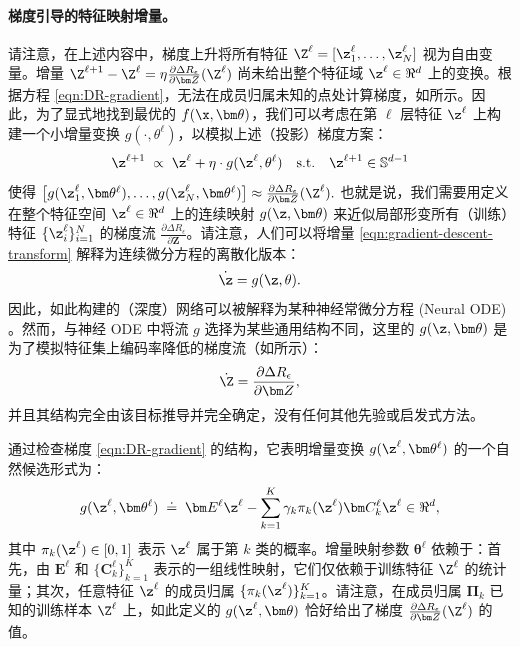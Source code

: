 \documentclass[../../book-main_zh.tex]{subfiles}
\begin{document}
\paragraph{梯度引导的特征映射增量。} 请注意，在上述内容中，梯度上升将所有特征 $\Z^{\ell} =
[\z^{\ell}_{1}, \dots, \z^{\ell}_{N}]$ 视为自由变量。增量 $\Z^{\ell+1} - \Z^{\ell} = \eta \frac{\partial \Delta
R_{\epsilon}}{\partial \bm Z}(\Z^\ell)$ 尚未给出整个特征域 $\z^\ell \in \Re^d$ 上的变换。根据方程 \eqref{eqn:DR-gradient}，无法在成员归属未知的点处计算梯度，如所示。因此，为了显式地找到最优的 $f(\x,\bm  \theta)$，我们可以考虑在第 $\ell$ 层特征 $\z^\ell$ 上构建一个小增量变换 $g(\cdot, \theta^{\ell})$，以模拟上述（投影）梯度方案：
\begin{equation}
    \z^{\ell + 1}   \; \propto \; \z^{\ell} + \eta\cdot  g(\z^{\ell},
    \theta^{\ell}) \quad \text{s.t.} \quad \z^{\ell +1}
    \in \mathbb{S}^{d-1}
    \label{eqn:gradient-descent-transform}
\end{equation}
使得 $\big[g(\z_1^{\ell}, \bm \theta^{\ell}), \ldots,
g(\z_N^{\ell}, \bm \theta^{\ell}) \big] \approx \frac{\partial \Delta
R_{\epsilon}}{\partial \bm Z}(\Z^\ell).$ 也就是说，我们需要用定义在整个特征空间 $\z^\ell \in \Re^d$ 上的连续映射 $g(\z,\bm
\theta)$ 来近似局部形变所有（训练）特征 $\{\z_i^\ell\}_{i=1}^N$ 的梯度流 $\frac{\partial \Delta
R_{\epsilon}}{\partial \bm Z}$。请注意，人们可以将增量 \eqref{eqn:gradient-descent-transform} 解释为连续微分方程的离散化版本：
\begin{equation}
    \dot{\z} = g(\z, \theta).
\end{equation}
因此，如此构建的（深度）网络可以被解释为某种神经常微分方程 (Neural ODE) \cite{chen2018neural}。然而，与神经 ODE 中将流 $g$ 选择为某些通用结构不同，这里的 $g(\z, \bm\theta)$ 是为了模拟特征集上编码率降低的梯度流（如所示）：
\begin{equation*}
    \dot{\Z} = \frac{\partial \Delta R_{\epsilon}}{\partial \bm Z},
\end{equation*}
并且其结构完全由该目标推导并完全确定，没有任何其他先验或启发式方法。

通过检查梯度 \eqref{eqn:DR-gradient} 的结构，它表明增量变换 $g(\z^\ell, \bm \theta^\ell)$ 的一个自然候选形式为：
\begin{equation}
    g(\z^\ell, \bm \theta^\ell) \; \doteq \; \bm E^\ell \z^\ell -
    \sum_{k=1}^K \gamma_{k} \pi_k(\z^\ell)\bm C_{k}^{\ell}  \z^{\ell}
    \in \Re^d,
    \label{eqn:DR-gradient-transform}
\end{equation}
其中 $\pi_k(\z^\ell) \in [0,1]$ 表示 $\z^{\ell}$ 属于第 $k$ 类的概率。增量映射参数 $\bm \theta^\ell$ 依赖于：首先，由 $\bm E^{\ell}$ 和 $\{ \bm C^{\ell}_{k}\}_{k=1}^{K}$ 表示的一组线性映射，它们仅依赖于训练特征 $\Z^\ell$ 的统计量；其次，任意特征 $\z^\ell$ 的成员归属 $\{ \pi_k(\z^\ell)\}_{k=1}^K$。请注意，在成员归属 $\bm \Pi_k$ 已知的训练样本 $\Z^\ell$ 上，如此定义的 $g(\z^\ell, \bm
\theta)$ 恰好给出了梯度 $\frac{\partial \Delta
R_{\epsilon}}{\partial \bm Z}(\Z^\ell)$ 的值。
\end{document}
